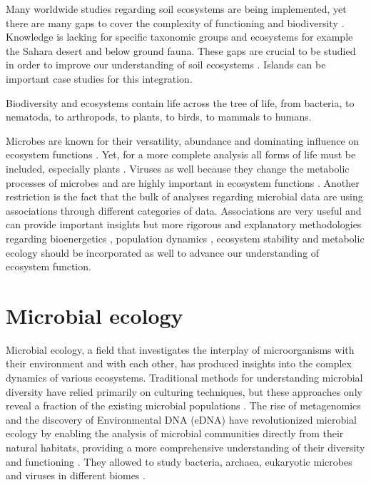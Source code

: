 Many worldwide studies regarding soil ecosystems are being implemented, yet
there are many gaps to cover the complexity of functioning and biodiversity
\parencite{guerra2020Blind}. Knowledge is lacking for specific taxonomic groups and
ecosystems for example the Sahara desert and below ground fauna.
These gaps are crucial to be studied in order to
improve our understanding of soil ecosystems \parencite{cameron2018Global}. 
Islands can be important case studies for this integration.


Biodiversity and ecosystems contain life across the tree of life, from
bacteria, to nematoda, to arthropods, to plants, to birds, to mammals to 
humans.



Microbes are known for their versatility, abundance and dominating influence on ecosystem
functions \parencite{falkowski2008microbial}. Yet, for a more complete analysis all forms of life must be included,
especially plants \parencite{thompson2012Food}. Viruses as well because they
change the metabolic processes of microbes and are highly important in
ecosystem functions \parencite{hurwitz2016Viral}. Another restriction is the fact
that the bulk of analyses regarding microbial data are using associations
through different categories of data. Associations are very useful and can
provide important insights but more rigorous and explanatory methodologies
regarding bioenergetics \parencite{kempes2012Growth}, population dynamics
\parencite{gonze2018Microbial}, ecosystem stability \parencite{berdugo2020Global} and
metabolic ecology \parencite{brown2004METABOLIC} should be incorporated as well to
advance our understanding of ecosystem function.


\section{Microbial ecology}
\label{sec:microbial_ecology}

Microbial ecology, a field that investigates the interplay of microorganisms with
their environment and with each other, has produced insights into
the complex dynamics of various ecosystems.
Traditional methods for understanding microbial diversity have relied primarily
on culturing techniques, but these approaches only reveal a fraction of the
existing microbial populations \parencite{prosser2020Conceptual}.
The rise of metagenomics and the discovery of
Environmental DNA (eDNA) have revolutionized microbial ecology by enabling the
analysis of microbial communities directly from their natural habitats,
providing a more comprehensive understanding of their diversity and
functioning \parencite{raes2008Molecular}. They allowed to 
study bacteria, archaea, eukaryotic microbes and viruses in different biomes \parencite{nayfach2021a-genomic}.

